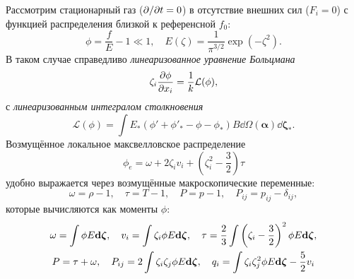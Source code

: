 Рассмотрим стационарный газ (\(\Pder{t}=0\)) в отсутствие внешних сил (\(F_i=0\))
с функцией распределения близкой к референсной \(f_0\):
\begin{equation}\label{eq:linear_condition}
    \phi = \frac{f}{E} - 1 \ll 1, \quad E(\zeta) = \frac1{\pi^{3/2}}\exp\left(-\zeta^2\right).
\end{equation}
В таком случае справедливо \emph{линеаризованное уравнение Больцмана}
\begin{equation}\label{eq:linear_Boltzmann}
    \zeta_i \pder[\phi]{x_i} = \frac1k \mathcal{L}(\phi),
\end{equation}
с \emph{линеаризованным интегралом столкновения}
\begin{equation}\label{eq:linear_ci}
    \mathcal{L}(\phi) = \int E_*(\phi'+\phi'_*-\phi-\phi_*) B
    \dd \Omega(\boldsymbol{\alpha}) \boldsymbol{\dd \zeta_*}.
\end{equation}
Возмущённое локальное максвелловское распределение
\begin{equation}\label{eq:linear_maxwellian}
    \phi_e = \omega + 2\zeta_i v_i + \left(\zeta_i^2-\frac32\right)\tau
\end{equation}
удобно выражается через возмущённые макроскопические переменные:
\begin{equation}\label{eq:linear_macro}
    \omega = \rho-1, \quad \tau = T-1, \quad P = p-1, \quad P_{ij} = p_{ij} - \delta_{ij},
\end{equation}
которые вычисляются как моменты \(\phi\):
\begin{gather}\label{eq:linear_macro_variables}
    \begin{gathered}
        \omega = \int \phi E\dzeta, \quad
        v_i = \int \zeta_i \phi E\dzeta, \quad
        \tau = \frac23 \int \left( \zeta_i-\frac32 \right)^2 \phi E\dzeta, \\
        P = \tau + \omega, \quad
        P_{ij} = 2\int \zeta_i\zeta_j\phi E\dzeta, \quad
        q_i = \int \zeta_i\zeta_j^2\phi E\dzeta - \frac52v_i
    \end{gathered}
\end{gather}

